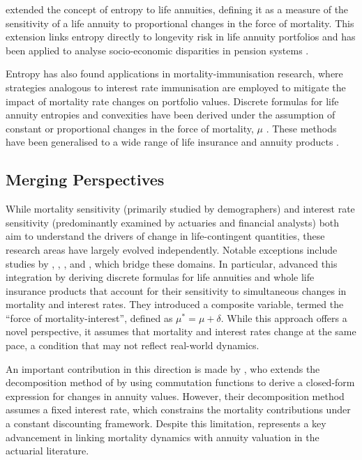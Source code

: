\documentclass[12pt]{article}
\begin{document}
\citet{Haberman2011} extended the concept of entropy to life annuities, defining it as a measure of the sensitivity of a life annuity to proportional changes in the force of mortality. This extension links entropy directly to longevity risk in life annuity portfolios \citep{rabitti2020mortality} and has been applied to analyse socio-economic disparities in pension systems \citep{alvarez2021linking}.

Entropy has also found applications in mortality-immunisation research, where strategies analogous to interest rate immunisation are employed to mitigate the impact of mortality rate changes on portfolio values. Discrete formulas for life annuity entropies and convexities have been derived under the assumption of constant or proportional changes in the force of mortality, $\mu$ \citep{wang2010optimal,tsai2011actuarial,Tsai2013a,Li2011}. These methods have been generalised to a wide range of life insurance and annuity products \citep{li2012key,Li2012,Wong2015,Luciano2015,levantesi2018natural}.

\subsection{Merging Perspectives}

While mortality sensitivity (primarily studied by demographers) and interest rate sensitivity (predominantly examined by actuaries and financial analysts) both aim to understand the drivers of change in life-contingent quantities, these research areas have largely evolved independently. Notable exceptions include studies by \citet{Haberman2011}, \citet{rabitti2020mortality}, \citet{Lin2020}, \citet{alvarez2021linking} and \citet{di2025decomposing}, which bridge these domains. In particular, \citet{Lin2020} advanced this integration by deriving discrete formulas for life annuities and whole life insurance products that account for their sensitivity to simultaneous changes in mortality and interest rates. They introduced a composite variable, termed the ``force of mortality-interest'', defined as $\mu^* = \mu + \delta$. While this approach offers a novel perspective, it assumes that mortality and interest rates change at the same pace, a condition that may not reflect real-world dynamics. 


An important contribution in this direction is made by \citet{di2025decomposing}, who extends the decomposition method of \citet{Vaupel2003} by using commutation functions to derive a closed-form expression for changes in annuity values. %
However, their decomposition method assumes a fixed interest rate, which constrains the mortality contributions under a constant discounting framework. Despite this limitation, \citet{di2025decomposing} represents a key advancement in linking mortality dynamics with annuity valuation in the actuarial literature.
\end{document}
